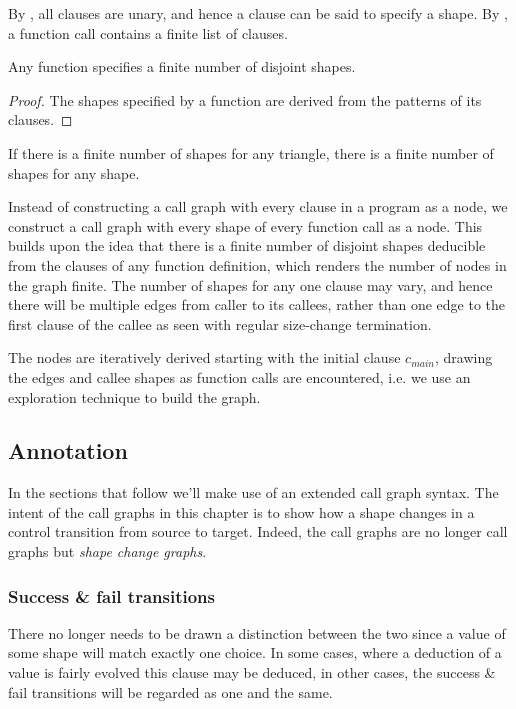 By , all clauses are unary, and hence a clause
can be said to specify a shape. By , a
function call contains a finite list of clauses.

\begin{theorem} Any function specifies a finite number of disjoint
shapes.\end{theorem}

\begin{proof} The shapes specified by a function are derived from the patterns
of its clauses.\end{proof}

If there is a finite number of shapes for any triangle, there is a finite number of shapes for any shape.

Instead of constructing a call graph with every clause in a program as a node,
we construct a call graph with every shape of every function call as a node.
This builds upon the idea that there is a finite number of disjoint shapes
deducible from the clauses of any function definition, which renders the number
of nodes in the graph finite. The number of shapes for any one clause may vary,
and hence there will be multiple edges from caller to its callees, rather than
one edge to the first clause of the callee as seen with regular size-change
termination.

The nodes are iteratively derived starting with the initial clause $c_{main}$,
drawing the edges and callee shapes as function calls are encountered, i.e. we
use an exploration technique to build the graph.

\subsection{Annotation}

In the sections that follow we'll make use of an extended call graph syntax.
The intent of the call graphs in this chapter is to show how a shape changes in
a control transition from source to target. Indeed, the call graphs are no
longer call graphs but \emph{shape change graphs}.

\subsubsection{Success \& fail transitions}

There no longer needs to be drawn a distinction between the two since a value
of some shape will match exactly one choice. In some cases, where a deduction
of a value is fairly evolved this clause may be deduced, in other cases, the
success \& fail transitions will be regarded as one and the same. 

